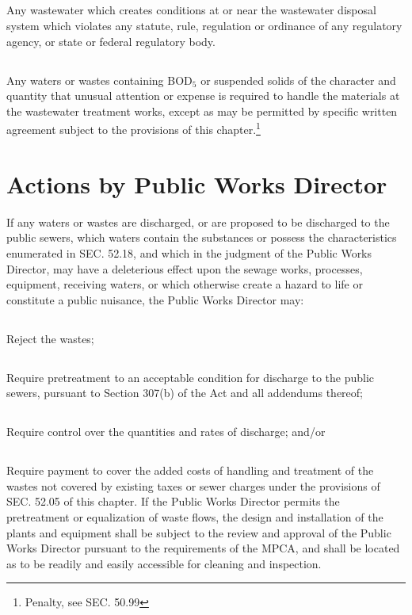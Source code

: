 \subsection{}
Any wastewater which creates conditions at or near the wastewater disposal system which violates any statute, rule, regulation or ordinance of any regulatory agency, or state or federal regulatory body.
\subsection{}
Any waters or wastes containing BOD$_{5}$ or suspended solids of the character and quantity that unusual attention or expense is required to handle the materials at the wastewater treatment works, except as may be permitted by specific written agreement subject to the provisions of this chapter.\footnote{Penalty, see SEC. 50.99}

\section{Actions by Public Works Director}
If any waters or wastes are discharged, or are proposed to be discharged to the public sewers, which waters contain the substances or possess the characteristics enumerated in SEC. 52.18, and which in the judgment of the Public Works Director, may have a deleterious effect upon the sewage works, processes, equipment, receiving waters, or which otherwise create a hazard to life or constitute a public nuisance, the Public Works Director may:
\subsection{}
Reject the wastes;
\subsection{}
Require pretreatment to an acceptable condition for discharge to the public sewers, pursuant to Section 307(b) of the Act and all addendums thereof;
\subsection{}
Require control over the quantities and rates of discharge; and/or
\subsection{}
Require payment to cover the added costs of handling and treatment of the wastes not covered by existing taxes or sewer charges under the provisions of SEC. 52.05 of this chapter.  If the Public Works Director permits the pretreatment or equalization of waste flows, the design and installation of the plants and equipment shall be subject to the review and approval of the Public Works Director pursuant to the requirements of the MPCA, and shall be located as to be readily and easily accessible for cleaning and inspection.

